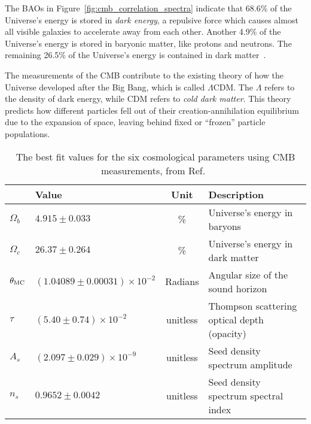 The BAOs in Figure~\ref{fig:cmb_correlation_spectra} indicate that 68.6\% of the Universe's energy is stored in \textit{dark energy}, a repulsive force which causes almost all visible galaxies to accelerate away from each other.
Another 4.9\% of the Universe's energy is stored in baryonic matter, like protons and neutrons.
The remaining 26.5\% of the Universe's energy is contained in dark matter~\cite{planck2015}.

The measurements of the CMB contribute to the existing theory of how the Universe developed after the Big Bang, which is called $\Lambda$CDM.
The $\Lambda$ refers to the density of dark energy, while CDM refers to \textit{cold dark matter}.
This theory predicts how different particles fell out of their creation-annihilation equilibrium due to the expansion of space, leaving behind fixed or ``frozen'' particle populations.

%   

\begin{table}[t]
  \centering
  \begin{tabular}{llcl}
               & \textbf{Value}                 & \textbf{Unit} & \textbf{Description} \\
    \hline 
    $\Omega_b$ & $ 4.915  \pm0.033                 $ & \%       & Universe's energy in baryons \\
    $\Omega_c$ & $ 26.37  \pm0.264                 $ & \%       & Universe's energy in dark matter \\
    $\theta_{\textrm{MC}}$ & $(1.04089\pm0.00031)\times 10^{-2}$ & Radians  & Angular size of the sound horizon \\
    $\tau$     & $(5.40   \pm0.74   )\times 10^{-2}$ & unitless & Thompson scattering optical depth (opacity)\\
    $A_s$      & $(2.097  \pm0.029  )\times 10^{-9}$ & unitless & Seed density spectrum amplitude \\
    $n_s$      & $ 0.9652 \pm0.0042                $ & unitless & Seed density spectrum spectral index \\
    \hline 
  \end{tabular}
  \caption[6 Cosmological Parameters]{
    The best fit values for the six cosmological parameters using CMB measurements, from Ref.~\cite{planck_dm_limit}}
  \label{tab:six_params}
\end{table}

